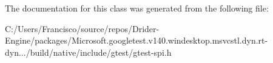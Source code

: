 The documentation for this class was generated from the following file\+:\begin{DoxyCompactItemize}
\item 
C\+:/\+Users/\+Francisco/source/repos/\+Drider-\/\+Engine/packages/\+Microsoft.\+googletest.\+v140.\+windesktop.\+msvcstl.\+dyn.\+rt-\/dyn.../build/native/include/gtest/gtest-\/spi.\+h\end{DoxyCompactItemize}
